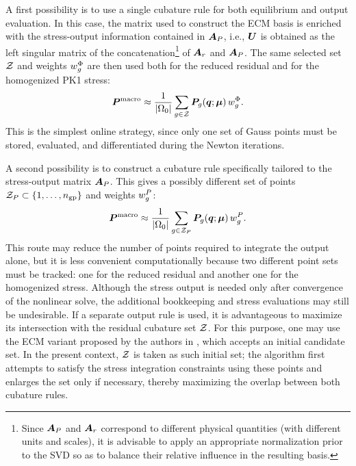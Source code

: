 \documentclass[11pt,a4paper]{article}
\begin{document}
A first possibility is to use a single cubature rule for both equilibrium and
output evaluation. In this case, the matrix used to construct the ECM basis is
enriched with the stress-output information contained in $\bm{A}_{P}$, i.e., $\bm{U}$ is
obtained as the left singular matrix of the concatenation\footnote{Since $\bm{A}_{P}$ and $\bm{A}_{r}$ correspond to different physical quantities
(with different units and scales), it is advisable to apply an appropriate
normalization prior to the SVD so as to balance their relative influence in the
resulting basis.  } of $\bm{A}_{r}$ and $\bm{A}_{P}$. The same selected
set $\mathcal{Z}$ and weights $w^{\Phi}_{g}$ are then used both for the reduced residual
and for the homogenized PK1 stress:
\begin{equation}
\label{eq:simple1}
    \bm{P}^{\mathrm{macro}}
    \approx
    \frac{1}{|\Omega_0|}
    \sum_{g\in\mathcal{Z}}
    \boldsymbol{P}_g(\bm{q};\bm{\mu})\,w^{\Phi}_{g}.
\end{equation}
This is the simplest online strategy, since only one set of Gauss points must be
stored, evaluated, and differentiated during the Newton iterations.

A second possibility is to construct a cubature rule specifically tailored to the
stress-output matrix $\bm{A}_{P}$. This gives a possibly different set of points
$\mathcal{Z}_{P}\subset\{1,\ldots,n_{\mathrm{gp}}\}$ and weights $w^{P}_{g}$:
\begin{equation}
    \bm{P}^{\mathrm{macro}}
    \approx
    \frac{1}{|\Omega_0|}
    \sum_{g\in\mathcal{Z}_{P}}
    \boldsymbol{P}_g(\bm{q};\bm{\mu})\,w^{P}_{g}.
    \label{eq:PKmacro_output_rule}
\end{equation}
This route may reduce the number of points required to integrate the output
alone, but it is less convenient computationally because two different point
sets must be tracked: one for the reduced residual and another one for the
homogenized stress. Although the stress output is needed only after convergence
of the nonlinear solve, the additional bookkeeping and stress evaluations may
still be undesirable.
If a separate output rule is used, it is advantageous to maximize its
intersection with the residual cubature set $\mathcal{Z}$. For this purpose, one may
use the ECM variant proposed by the authors in \cite{bravo2024subspace}, which
accepts an initial candidate set. In the present context, $\mathcal{Z}$ is taken as
such initial set; the algorithm first attempts to satisfy the stress
integration constraints using these points and enlarges the set only if
necessary, thereby maximizing the overlap between both cubature rules.
\end{document}
